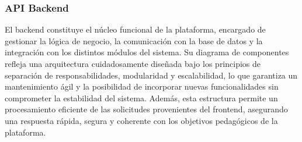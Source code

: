 \subsubsection{API Backend}

El backend constituye el núcleo funcional de la plataforma, encargado de gestionar la lógica de negocio, la comunicación con la base de datos y la integración con los distintos módulos del sistema. Su diagrama de componentes refleja una arquitectura cuidadosamente diseñada bajo los principios de separación de responsabilidades, modularidad y escalabilidad, lo que garantiza un mantenimiento ágil y la posibilidad de incorporar nuevas funcionalidades sin comprometer la estabilidad del sistema. Además, esta estructura permite un procesamiento eficiente de las solicitudes provenientes del frontend, asegurando una respuesta rápida, segura y coherente con los objetivos pedagógicos de la plataforma.





